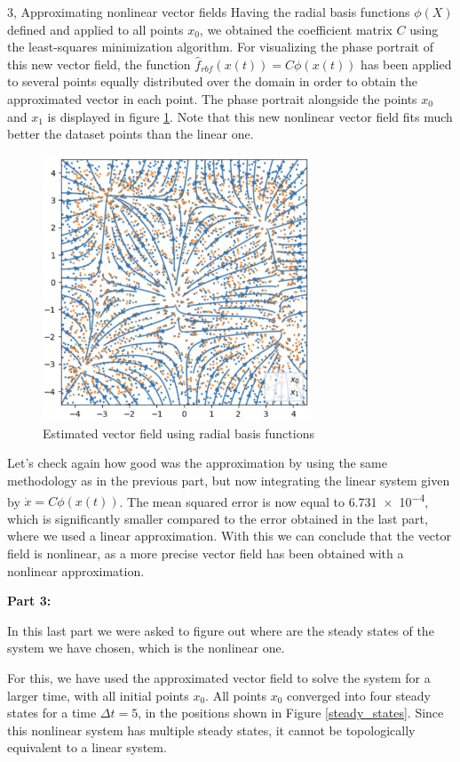 \documentclass[10pt,a4paper]{article}
\begin{document}
\begin{task}{3, Approximating nonlinear vector fields}
Having the radial basis functions $\phi(X)$ defined and applied to all points $x_0$, we obtained the coefficient matrix $C$ using the least-squares minimization algorithm. For visualizing the phase portrait of this new vector field, the function $\hat{f}_{rbf}(x(t)) = C\phi(x(t))$ has been applied to several points equally distributed over the domain in order to obtain the approximated vector in each point. The phase portrait alongside the points $x_0$ and $x_1$ is displayed in figure \ref{nonlinear_vector_field2}. Note that this new nonlinear vector field fits much better the dataset points than the linear one.

\begin{figure}[H]
    \centering
    \includegraphics[width=8cm]{images/nonlinear_vector_field2.jpg}
    \caption{Estimated vector field using radial basis functions}
    \label{nonlinear_vector_field2}
\end{figure}

Let's check again how good was the approximation by using the same methodology as in the previous part, but now integrating the linear system given by $\dot x = C\phi(x(t))$. The mean squared error is now equal to \num{6.731e-4}, which is significantly smaller compared to the error obtained in the last part, where we used a linear approximation. With this we can conclude that the vector field is nonlinear, as a more precise vector field has been obtained with a nonlinear approximation.

\newpage

\noindent \textbf{Part 3:}

In this last part we were asked to figure out where are the steady states of the system we have chosen, which is the nonlinear one.

For this, we have used the approximated vector field to solve the system for a larger time, with all initial points $x_0$. All points $x_0$ converged into four steady states for a time $\Delta t = 5$, in the positions shown in Figure \ref{steady_states}. Since this nonlinear system has multiple steady states, it cannot be topologically equivalent to a linear system.


\end{task}
\end{document}

